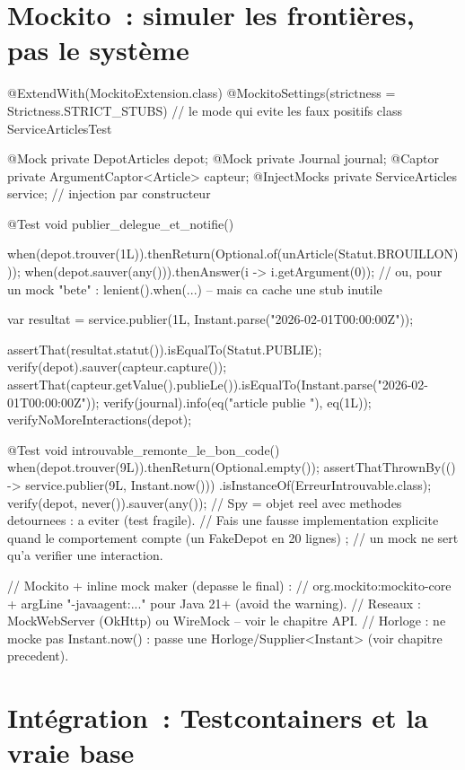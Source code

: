 \documentclass[12pt,a4paper,twoside,openright]{book}
\begin{document}
\section{Mockito~: simuler les fronti\`eres, pas le syst\`eme}

\begin{codejava}
@ExtendWith(MockitoExtension.class)
@MockitoSettings(strictness = Strictness.STRICT_STUBS)      // le mode qui evite les faux positifs
class ServiceArticlesTest {

    @Mock private DepotArticles depot;
    @Mock private Journal journal;
    @Captor private ArgumentCaptor<Article> capteur;
    @InjectMocks private ServiceArticles service;            // injection par constructeur

    @Test void publier_delegue_et_notifie() {
        when(depot.trouver(1L)).thenReturn(Optional.of(unArticle(Statut.BROUILLON)));
        when(depot.sauver(any())).thenAnswer(i -> i.getArgument(0));
        // ou, pour un mock "bete" : lenient().when(...) -- mais ca cache une stub inutile

        var resultat = service.publier(1L, Instant.parse("2026-02-01T00:00:00Z"));

        assertThat(resultat.statut()).isEqualTo(Statut.PUBLIE);
        verify(depot).sauver(capteur.capture());
        assertThat(capteur.getValue().publieLe()).isEqualTo(Instant.parse("2026-02-01T00:00:00Z"));
        verify(journal).info(eq("article publie {}"), eq(1L));
        verifyNoMoreInteractions(depot);
    }

    @Test void introuvable_remonte_le_bon_code() {
        when(depot.trouver(9L)).thenReturn(Optional.empty());
        assertThatThrownBy(() -> service.publier(9L, Instant.now()))
                .isInstanceOf(ErreurIntrouvable.class);
        verify(depot, never()).sauver(any());
    }
    // Spy = objet reel avec methodes detournees : a eviter (test fragile).
    // Fais une fausse implementation explicite quand le comportement compte (un FakeDepot en 20 lignes) ;
    // un mock ne sert qu'a verifier une interaction.
}
// Mockito + inline mock maker (depasse le final) :
// org.mockito:mockito-core + argLine "-javaagent:..." pour Java 21+ (avoid the warning).
// Reseaux : MockWebServer (OkHttp) ou WireMock -- voir le chapitre API.
// Horloge : ne mocke pas Instant.now() : passe une Horloge/Supplier<Instant> (voir chapitre precedent).
\end{codejava}

\section{Int\'egration~: Testcontainers et la vraie base}
\end{document}
